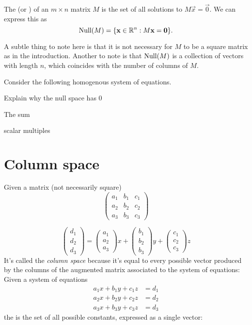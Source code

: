 \documentclass{ximera}
\begin{document}
\begin{definition}
  The  (or ) of an $m \times n$ matrix $M$ is
  the set of all solutions to $M\vec{x} = \vec{0}$. We can express
  this as
  \[
  \operatorname{Null}(M) = \{ \mathbf{x}\in\mathbb{R}^n: M\mathbf{x} = \mathbf{0}\}.
  \]
\end{definition}

\begin{remark}
  A subtle thing to note here is that it is not necessary for $M$ to be
  a square matrix as in the introduction. Another to note is that
  $\operatorname{Null}(M)$ is a collection of vectors with length $n$, which coincides
  with the number of columns of $M$.
\end{remark}


\begin{example}
  Consider the following homogenous system of equations.

  Explain why the null space has 0

  The sum

  scalar multiples

\end{example}





\section{Column space}

Given a matrix (not necessarily square)
\[
\begin{pmatrix}
  a_1 &  b_1  &  c_1 \\
  a_2 & b_2 & c_2 \\
  a_3 & b_3 & c_3
\end{pmatrix}
\]

\[
\begin{pmatrix} d_1 \\ d_2 \\ d_3 \end{pmatrix}=\begin{pmatrix} a_1 \\ a_2 \\ a_3 \end{pmatrix} x +
\begin{pmatrix} b_1 \\ b_2 \\ b_3 \end{pmatrix} y +
\begin{pmatrix} c_1 \\ c_2 \\ c_3 \end{pmatrix} z
\]
It's called the \textit{column space} because it's equal to every
possible vector produced by the columns of the augmented matrix
associated to the system of equations:
Given a system of equations
\begin{align*}
  a_1 x + b_1 y + c_1 z &= d_1\\
  a_2 x + b_2 y + c_2 z &= d_2\\
  a_3 x + b_3 y + c_3 z &= d_3
\end{align*}
the  is the set of all possible constants, expressed
as a single vector:
\end{document}
